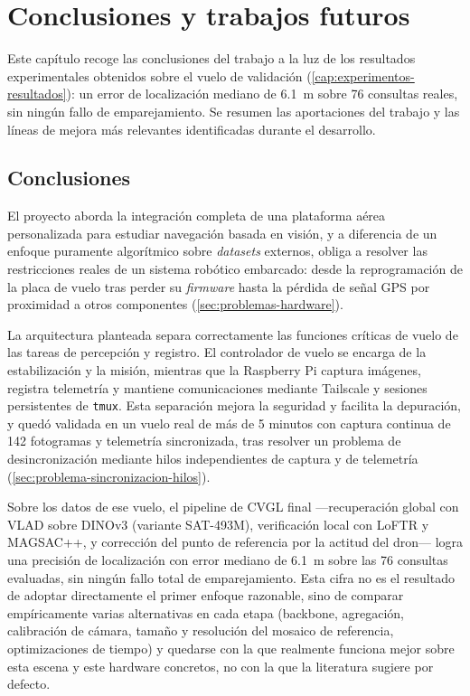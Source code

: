 
\chapter{Conclusiones y trabajos futuros}
\label{cap:conclusiones}

\begin{Resumen}
Este capítulo recoge las conclusiones del trabajo a la luz de los resultados experimentales obtenidos sobre el vuelo de validación (\autoref{cap:experimentos-resultados}): un error de localización mediano de \SI{6.1}{\metre} sobre 76 consultas reales, sin ningún fallo de emparejamiento. Se resumen las aportaciones del trabajo y las líneas de mejora más relevantes identificadas durante el desarrollo.
\end{Resumen}

\section{Conclusiones}
\label{sec:conclusiones-provisionales}

El proyecto aborda la integración completa de una plataforma aérea personalizada para estudiar navegación basada en visión, y a diferencia de un enfoque puramente algorítmico sobre \textit{datasets} externos, obliga a resolver las restricciones reales de un sistema robótico embarcado: desde la reprogramación de la placa de vuelo tras perder su \textit{firmware} hasta la pérdida de señal GPS por proximidad a otros componentes (\autoref{sec:problemas-hardware}).

La arquitectura planteada separa correctamente las funciones críticas de vuelo de las tareas de percepción y registro. El controlador de vuelo se encarga de la estabilización y la misión, mientras que la Raspberry Pi captura imágenes, registra telemetría y mantiene comunicaciones mediante Tailscale y sesiones persistentes de \texttt{tmux}. Esta separación mejora la seguridad y facilita la depuración, y quedó validada en un vuelo real de más de 5 minutos con captura continua de 142 fotogramas y telemetría sincronizada, tras resolver un problema de desincronización mediante hilos independientes de captura y de telemetría (\autoref{sec:problema-sincronizacion-hilos}).

Sobre los datos de ese vuelo, el pipeline de CVGL final —recuperación global con VLAD sobre DINOv3 (variante SAT-493M), verificación local con LoFTR y MAGSAC++, y corrección del punto de referencia por la actitud del dron— logra una precisión de localización con error mediano de \SI{6.1}{\metre} sobre las 76 consultas evaluadas, sin ningún fallo total de emparejamiento. Esta cifra no es el resultado de adoptar directamente el primer enfoque razonable, sino de comparar empíricamente varias alternativas en cada etapa (backbone, agregación, calibración de cámara, tamaño y resolución del mosaico de referencia, optimizaciones de tiempo) y quedarse con la que realmente funciona mejor sobre esta escena y este hardware concretos, no con la que la literatura sugiere por defecto.


